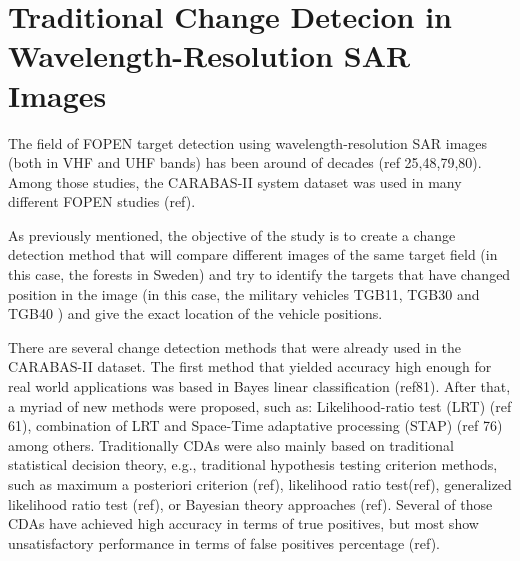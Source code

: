 \section{Traditional Change Detecion in Wavelength-Resolution SAR Images}

The field of FOPEN target detection using wavelength-resolution SAR images (both in VHF and UHF bands) has been 
around of decades (ref 25,48,79,80). Among those studies, the CARABAS-II system dataset was used in many different FOPEN studies 
(ref). 

As previously mentioned, the objective of the study is to create a change detection method that will compare 
different images of the same target field (in this case, the forests in Sweden) and try to identify the targets that 
have changed position in the image (in this case, the military vehicles TGB11, TGB30 and TGB40 ) and give the exact location of the vehicle positions.


There are several change detection methods that were already used in the CARABAS-II dataset.
The first method that yielded accuracy high enough for real world applications was based in Bayes linear classification (ref81).
After that, a myriad of new methods were proposed, such as: Likelihood-ratio test (LRT) (ref 61), combination of LRT and Space-Time 
adaptative processing (STAP) (ref 76) among others. Traditionally CDAs were also mainly based on traditional statistical decision theory, e.g., 
traditional hypothesis testing criterion methods, such as maximum a posteriori 
criterion (ref), likelihood ratio test(ref), generalized likelihood ratio test (ref), 
or Bayesian theory approaches (ref). Several of those CDAs have achieved high accuracy 
in terms of true positives, but most show unsatisfactory performance in terms of false positives percentage (ref).





